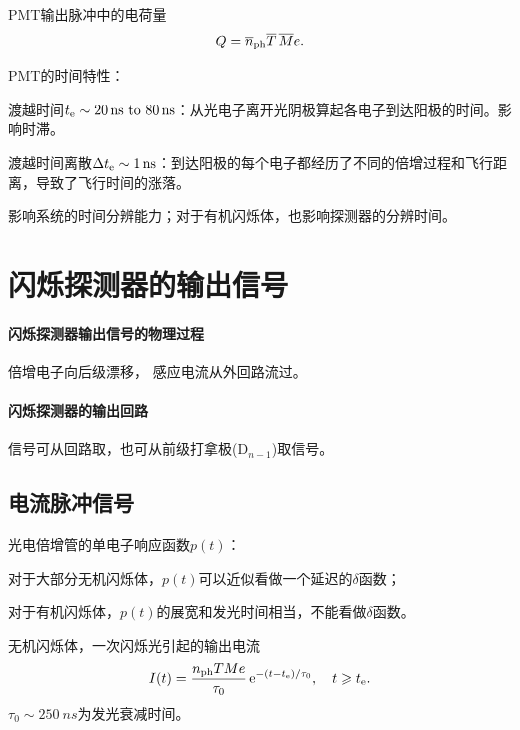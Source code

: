 PMT输出脉冲中的电荷量
\begin{align}
	Q = \overline{n}_{\mathrm{ph}}\overline{T}\,\overline{M}e.
\end{align}
\begin{compactitem}
	\item PMT的时间特性：
	\begin{compactitem}
		\item 渡越时间$t_\electron \sim \qtyrange{20}{80}{ns}$：从光电子离开光阴极算起各电子到达阳极的时间。影响时滞。
		\item 渡越时间离散$\Delta t_{\mathrm{e}} \sim \qty{1}{ns}$：到达阳极的每个电子都经历了不同的倍增过程和飞行距离，导致了飞行时间的涨落。
		
		影响系统的时间分辨能力；对于有机闪烁体，也影响探测器的分辨时间。
	\end{compactitem}
\end{compactitem}

\section{闪烁探测器的输出信号}

\paragraph{闪烁探测器输出信号的物理过程}
倍增电子向后级漂移，
感应电流从外回路流过。
\paragraph{闪烁探测器的输出回路}
信号可从回路取，也可从前级打拿极(D$_{n-1}$)取信号。

\subsection{电流脉冲信号}

光电倍增管的单电子响应函数$p(t)$：
\begin{compactitem}
	\item 对于大部分无机闪烁体，$p(t)$可以近似看做一个延迟的$\delta$函数；
	\item 对于有机闪烁体，$p(t)$的展宽和发光时间相当，不能看做$\delta$函数。
\end{compactitem}
无机闪烁体，一次闪烁光引起的输出电流
\begin{equation}\label{eq:nrd-scintillation-current-pulse}
	I(t) = \frac{n_{\mathrm{ph}}TMe}{\tau_0}\mathop{}\!\mathrm{e}^{-(t-t_{\mathrm{e}})/\tau_0},\quad t \geqslant t_{\mathrm{e}}.
\end{equation}
$\tau_0 \sim \qty{250}{ns}$为发光衰减时间。

